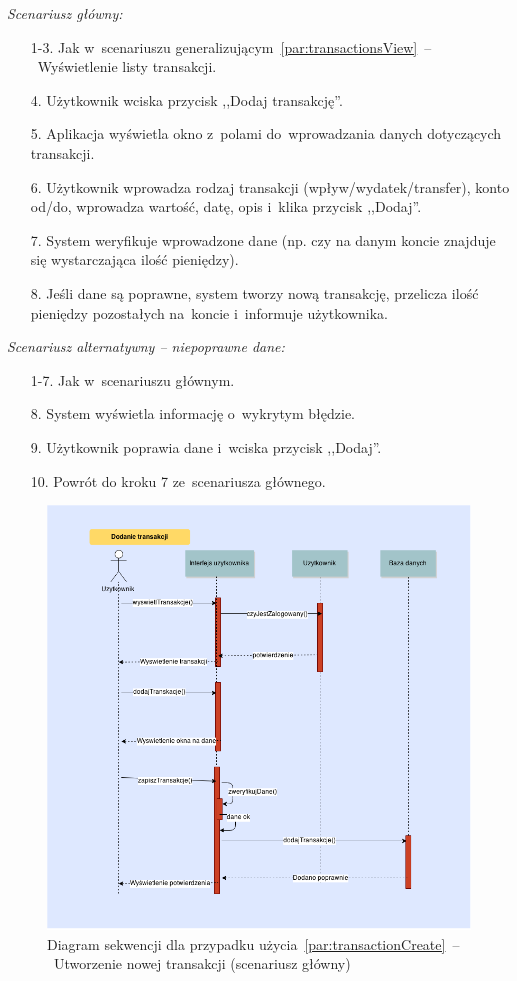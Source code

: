 \noindent \textit{Scenariusz główny:}
\begin{enumerate}
  \item[1-3.] Jak w~scenariuszu generalizującym~\ref{par:transactionsView}~--~Wyświetlenie listy transakcji.
  \item[4.] Użytkownik wciska przycisk ,,Dodaj transakcję''.
  \item[5.] Aplikacja wyświetla okno z~polami do~wprowadzania danych dotyczących transakcji.
  \item[6.] Użytkownik wprowadza rodzaj transakcji (wpływ/wydatek/transfer), konto od/do, wprowadza wartość, datę, opis i~klika przycisk ,,Dodaj''.
  \item[7.] System weryfikuje wprowadzone dane (np. czy na danym koncie znajduje się wystarczająca ilość pieniędzy).
  \item[8.] Jeśli dane są poprawne, system tworzy nową transakcję, przelicza ilość pieniędzy pozostałych na~koncie i~informuje użytkownika.
\end{enumerate}

\noindent \textit{Scenariusz alternatywny -- niepoprawne dane:}
\begin{enumerate}
  \item[1-7.] Jak w~scenariuszu głównym.
  \item[8.] System wyświetla informację o~wykrytym błędzie.
  \item[9.] Użytkownik poprawia dane i~wciska przycisk ,,Dodaj''.
  \item[10.] Powrót do kroku 7 ze~scenariusza głównego.
\end{enumerate}

\begin{figure}[H]
  \includegraphics[width=\textwidth]{images/dodanie_transakcji.png}
  \caption{Diagram sekwencji dla przypadku użycia~\ref{par:transactionCreate}~--~Utworzenie nowej transakcji (scenariusz główny)}
\end{figure}

